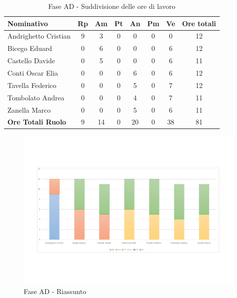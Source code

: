 \documentclass[../PianoProgetto.tex]{subfiles}
\begin{document}
	\begin{table}[H]
		\begin{tabularx}{\textwidth}{l  * {6}{C}  c}
			\toprule
			\textbf{Nominativo} & \textbf{Rp} & \textbf{Am} & \textbf{Pt} 
						& \textbf{An} & \textbf{Pm} & \textbf{Ve} & \textbf{Ore totali} \\
			\midrule
			Andrighetto Cristian & 9 & 3 &	0 &	0 & 0 & 0 & 12 \\
			Bicego Eduard & 0 & 6 & 0 & 0 & 0 & 6 & 12 \\
			Castello Davide & 0 & 5 & 0 & 0 & 0 & 6 & 11 \\
			Conti Oscar Elia & 0 & 0 &	0 &	6 & 0 & 6 & 12 \\
			Tavella Federico &	0 & 0 & 0 & 5 & 0 & 7 & 12 \\
			Tombolato Andrea & 0 & 0 &	0 &	4 & 0 & 7 & 11 \\
			Zanella Marco & 0 & 0 & 0 & 5 & 0 & 6 & 11 \\
			\midrule			
			\textbf{Ore Totali Ruolo} & 9 & 14 & 0 & 20 & 0 & 38 & 81 \\
			\bottomrule
		\end{tabularx}	
		\caption{Fase AD - Suddivisione delle ore di lavoro}
		\label{tab:faseAD_ore}	
	\end{table}
\vfill
\newpage
\vfill
	
	\begin{figure}[H]
		\centering
		\includegraphics[width=\textwidth , trim=2cm 4cm 2cm 4cm]{grafici/AD/AD-ore-persona}
			\caption{Fase AD - Riassunto}
		\label{fig:BarChart-faseAD_ore}
	\end{figure}
	
\end{document}
